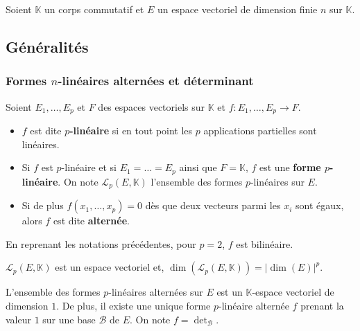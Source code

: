 




	Soient $\mathbb{K}$ un corps commutatif et $E$ un espace vectoriel de dimension finie $n$ sur $\mathbb{K}$.

	\subsection{Généralités}

	\subsubsection{Formes \texorpdfstring{$n$}{n}-linéaires alternées et déterminant}
	
	
	\begin{definition}
		Soient $E_1, \dots, E_p$ et $F$ des espaces vectoriels sur $\mathbb{K}$ et $f : E_1, \dots, E_p \rightarrow F$.
		\begin{itemize}
			\item $f$ est dite \textbf{$p$-linéaire} si en tout point les $p$ applications partielles sont linéaires.
			\item Si $f$ est $p$-linéaire et si $E_1 = \dots = E_p$ ainsi que $F = \mathbb{K}$, $f$ est une \textbf{forme $p$-linéaire}. On note $\mathcal{L}_p(E, \mathbb{K})$ l'ensemble des formes $p$-linéaires sur $E$.
			\item Si de plus $f(x_1, \dots, x_p) = 0$ dès que deux vecteurs parmi les $x_i$ sont égaux, alors $f$ est dite \textbf{alternée}.
		\end{itemize}
	\end{definition}
	
	\begin{example}
		En reprenant les notations précédentes, pour $p = 2$, $f$ est bilinéaire.
	\end{example}
	
	\begin{proposition}
		$\mathcal{L}_p(E, \mathbb{K})$ est un espace vectoriel et, $\operatorname{dim}(\mathcal{L}_p(E, \mathbb{K})) = |\operatorname{dim}(E)|^p$.
	\end{proposition}
	
	\begin{theorem}
		L'ensemble des formes $p$-linéaires alternées sur $E$ est un $\mathbb{K}$-espace vectoriel de dimension $1$. De plus, il existe une unique forme $p$-linéaire alternée $f$ prenant la valeur $1$ sur une base $\mathcal{B}$ de $E$. On note $f = \det_{\mathcal{B}}$.
	\end{theorem}
	
